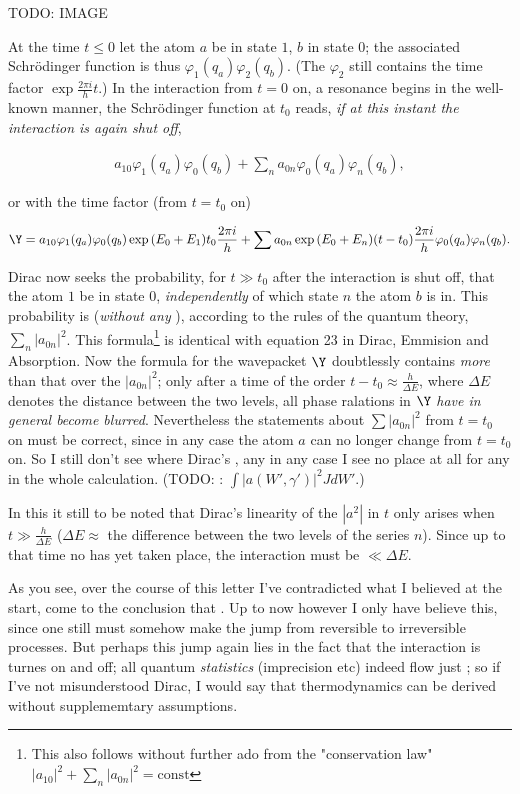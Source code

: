 \documentclass{article}
\newcommand{\uequ}[1]{
\begin{align*}
#1
\end{align*}
}
\newcommand{\sumX}[1]{\underset{#1}{\sum}}
\begin{document}
TODO: IMAGE

 At the time $t\leq 0$ let the atom $a$ be in state $1$, $b$ in state $0$; the associated Schr\"odinger function is thus $\varphi_1(q_a)\varphi_2(q_b)$. (The $\varphi_2$ still contains the time factor $\exp{\frac{2\pi i}{h}t}$.) In the interaction from $t=0$ on, a resonance begins in the well-known manner, the Schr\"odinger function at $t_0$ reads, \textit{if at this instant the interaction is again shut off},
\uequ{
a_{10}\varphi_1(q_a)\varphi_0(q_b) + \sumX{n}a_{0n}\varphi_0(q_a)\varphi_n(q_b),
}
or with the time factor (from $t=t_0$ on)
\uequ{
\Y = a_{10}\varphi_1(q_a)\varphi_0(q_b)\exp{(E_0 + E_1)t_0\frac{2\pi i}{h}}
   + \sum a_{0n}\exp{(E_0 + E_n)(t - t_0)\frac{2\pi i}{h}}\varphi_0 (q_a) \varphi_n(q_b).
}

Dirac now seeks the probability, for $t\gg t_0$ after the interaction is shut off, that the atom $1$ be in state $0$, \textit{independently} of which state $n$ the atom $b$ is in. This probability is (\textit{without any }), according to the rules of the quantum theory, $\sumX{n}|a_{0n}|^2$. This formula\footnote{This also follows without further ado from the "conservation law" $|a_{10}|^2 + \sumX{n}|a_{0n}|^2 = \text{const}$} is identical with equation 23 in Dirac, Emmision and Absorption. Now the formula for the wavepacket $\Y$ doubtlessly contains \textit{more}  than that over the $|a_{0n}|^2$; only after a time of the order $t-t_0 \approx \frac{h}{\Delta E}$, where $\Delta E$ denotes the distance between the two levels, all phase ralations in $\Y$ \textit{have in general become blurred}. Nevertheless the statements about $\sum{|a_{0n}|^2}$ from $t=t_0$ on must be correct, since in any case the atom $a$ can no longer change from $t=t_0$ on. So I still don't see where Dirac's  , any in any case I see no place at all for any  in the whole calculation. (TODO: : $\int |a(W',\gamma')|^2 J dW'$.)

In this it still to be noted that Dirac's linearity of the $|a^2|$ in $t$ only arises when $t \gg \frac{h}{\Delta E}$ ($\Delta E \approx$ the difference between the two levels of the series $n$). Since up to that time no  has yet taken place, the interaction must be $\ll \Delta E$.

As you see, over the course of this letter I've contradicted what I believed at the start, come to the conclusion that . Up to now however I only have believe this, since one still must somehow make the jump from reversible to irreversible processes. But perhaps this jump again lies in the fact that the interaction is turnes on and off; all quantum \textit{statistics} (imprecision etc) indeed flow just ; so if I've not misunderstood Dirac, I would say that thermodynamics can be derived without supplememtary assumptions.
\end{document}
